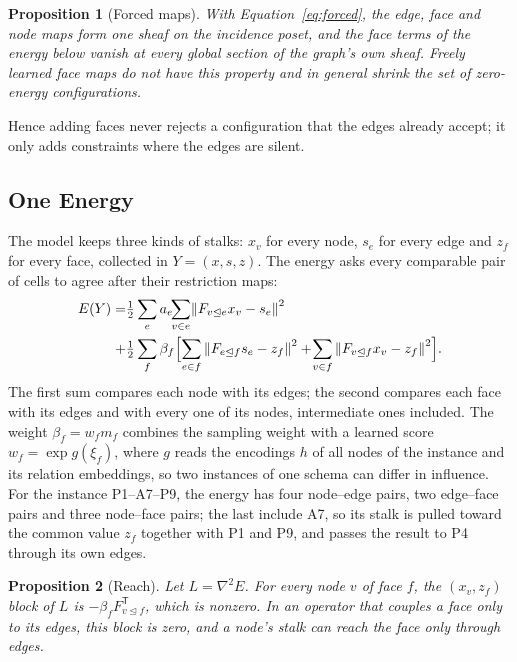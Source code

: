 \documentclass{article}
\newtheorem{proposition}{Proposition}
\newcommand{\norm}[1]{\left\lVert #1\right\rVert}
\newcommand{\transpose}{\mathsf{T}}
\newcommand{\inc}{\trianglelefteq}
\begin{document}
\begin{proposition}[Forced maps]\label{prop:forced}
With Equation~\eqref{eq:forced}, the edge, face and node maps form one sheaf on the incidence poset, and the face terms of the energy below vanish at every global section of the graph's own sheaf. Freely learned face maps do not have this property and in general shrink the set of zero-energy configurations.
\end{proposition}
Hence adding faces never rejects a configuration that the edges already accept; it only adds constraints where the edges are silent.

\subsection{One Energy}
\label{sec:energy}
The model keeps three kinds of stalks: $x_v$ for every node, $s_e$ for every edge and $z_f$ for every face, collected in $Y=(x,s,z)$. The energy asks every comparable pair of cells to agree after their restriction maps:
\begin{equation}
\begin{aligned}
  E(Y)=&\tfrac12\sum_{e}a_e\!\!\sum_{v\in e}\!\norm{F_{v\inc e}x_v-s_e}^2\\
  +&\tfrac12\sum_{f}\beta_f\Bigl[\sum_{e\in f}\norm{F_{e\inc f}s_e-z_f}^2+\!\sum_{v\in f}\norm{F_{v\inc f}x_v-z_f}^2\Bigr].
\end{aligned}
\label{eq:energy}
\end{equation}
The first sum compares each node with its edges; the second compares each face with its edges and with every one of its nodes, intermediate ones included. The weight $\beta_f=w_fm_f$ combines the sampling weight with a learned score $w_f=\exp g(\xi_f)$, where $g$ reads the encodings $h$ of all nodes of the instance and its relation embeddings, so two instances of one schema can differ in influence. For the instance P1--A7--P9, the energy has four node--edge pairs, two edge--face pairs and three node--face pairs; the last include A7, so its stalk is pulled toward the common value $z_f$ together with P1 and P9, and passes the result to P4 through its own edges.

\begin{proposition}[Reach]\label{prop:reach}
Let $L=\nabla^2E$. For every node $v$ of face $f$, the $(x_v,z_f)$ block of $L$ is $-\beta_fF_{v\inc f}^{\transpose}$, which is nonzero. In an operator that couples a face only to its edges, this block is zero, and a node's stalk can reach the face only through edges.
\end{proposition}
\end{document}
